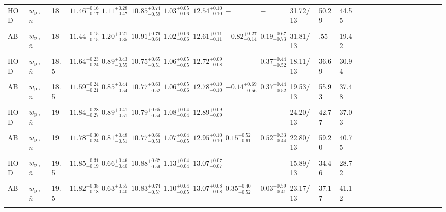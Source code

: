 \documentclass[14pt, preprint]{emulateapj}
\newcommand{\wpp}{w_{\rm p}}
\begin{document}
\begin{table*}
\begin{center}
\begin{tabular}{@{}lllllllllllllllllllllllll}

HOD  & $\wpp$, $\bar{n}$ & 18 & $11.46^{+0.16}_{-0.17}$ &  $1.11^{+0.28}_{-0.47}$ & $10.85^{+0.74}_{-0.59}$ & $1.03^{+0.05}_{-0.06}$ &  $12.54^{+0.10}_{-0.10}$ & $-$ & $-$ & 31.72/13 & 50.29 & 44.55\\ \\

AB & $\wpp$, $\bar{n}$ & 18 & $11.44^{+0.15}_{-0.15}$ &  $1.20^{+0.21}_{-0.35}$ & $10.91^{+0.79}_{-0.64}$ & $1.02^{+0.06}_{-0.06}$ &  $12.61^{+0.11}_{-0.11}$ & $-0.82^{+0.27}_{-0.14}$ & $0.19^{+0.67}_{-0.73}$ & 31.81/13 & .55 & 19.42 \\ \\

HOD & $\wpp$, $\bar{n}$ & 18.5 & $11.64^{+0.23}_{-0.24}$ &  $0.89^{+0.43}_{-0.55}$ & $10.75^{+0.65}_{-0.51}$ & $1.06^{+0.05}_{-0.05}$ &  $12.72^{+0.09}_{-0.08}$ & $-$ & $0.37^{+0.44}_{-0.52}$ & 18.11/13 & 36.69 & 30.94\\ \\

AB & $\wpp$, $\bar{n}$ & 18.5 & $11.59^{+0.24}_{-0.21}$ &  $0.85^{+0.44}_{-0.54}$ & $10.77^{+0.63}_{-0.52}$ & $1.06^{+0.05}_{-0.06}$ &  $12.78^{+0.10}_{-0.10}$ & $-0.14^{+0.69}_{-0.56}$ & $0.37^{+0.44}_{-0.52}$ & 19.53/13 & 55.93 & 37.48\\ \\

HOD & $\wpp$, $\bar{n}$ & 19 & $11.84^{+0.28}_{-0.27}$ &  $0.89^{+0.41}_{-0.51}$ & $10.79^{+0.65}_{-0.54}$ & $1.08^{+0.04}_{-0.04}$ &  $12.89^{+0.09}_{-0.09}$ & $-$ & $-$ & 24.20/13 & 42.77 & 37.03\\ \\

AB & $\wpp$, $\bar{n}$ & 19 & $11.78^{+0.30}_{-0.24}$ &  $0.81^{+0.48}_{-0.51}$ & $10.77^{+0.66}_{-0.53}$ & $1.07^{+0.04}_{-0.05}$ &  $12.95^{+0.10}_{-0.10}$ & $0.15^{+0.52}_{-0.61}$ & $0.52^{+0.33}_{-0.44}$ & 22.80/13 & 59.20 & 40.75\\ \\

HOD & $\wpp$, $\bar{n}$ & 19.5 & $11.85^{+0.31}_{-0.19}$ &  $0.66^{+0.46}_{-0.40}$ & $10.88^{+0.67}_{-0.59}$ & $1.13^{+0.04}_{-0.04}$ &  $13.07^{+0.07}_{-0.07}$ & $-$ & $-$ & 15.89/13 & 34.46 & 28.72\\ \\

AB & $\wpp$, $\bar{n}$ & 19.5 & $11.82^{+0.38}_{-0.18}$ &  $0.63^{+0.55}_{-0.40}$ & $10.83^{+0.74}_{-0.57}$ & $1.10^{+0.04}_{-0.05}$ &  $13.07^{+0.08}_{-0.08}$ & $0.35^{+0.40}_{-0.52}$ & $0.03^{+0.59}_{-0.41}$ & 23.17/13 & 37.17 & 41.12\\ \\


\end{tabular}
\end{center}
\end{table*}
\end{document}
